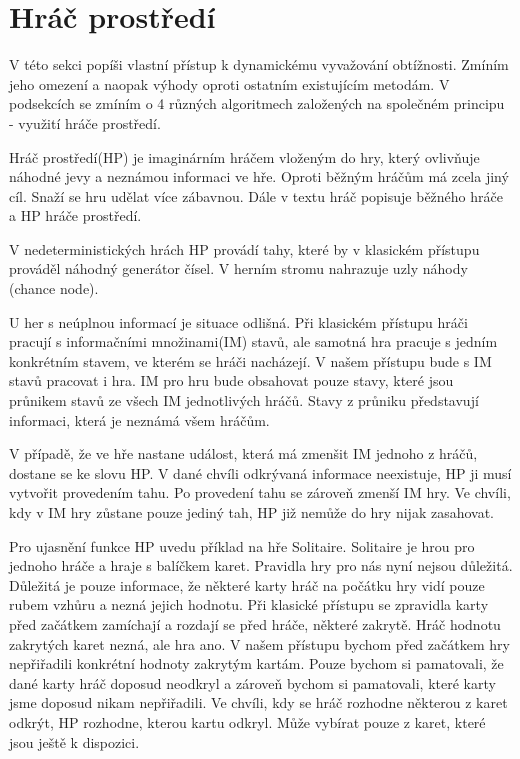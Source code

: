 \section{Hráč prostředí}

V této sekci popíši vlastní přístup k dynamickému vyvažování obtížnosti. Zmíním jeho omezení a naopak výhody oproti ostatním existujícím metodám. V podsekcích se zmíním o 4 různých algoritmech založených na společném principu - využití hráče prostředí.

Hráč prostředí(HP) je imaginárním hráčem vloženým do hry, který ovlivňuje náhodné jevy a neznámou informaci ve hře. Oproti běžným hráčům má zcela jiný cíl. Snaží se hru udělat více zábavnou. Dále v textu hráč popisuje běžného hráče a HP hráče prostředí.

V nedeterministických hrách HP provádí tahy, které by v klasickém přístupu prováděl náhodný generátor čísel. V herním stromu nahrazuje uzly náhody (chance node). 

U her s neúplnou informací je situace odlišná. Při klasickém přístupu hráči pracují s informačními množinami(IM) stavů, ale samotná hra pracuje s jedním konkrétním stavem, ve kterém se hráči nacházejí. V našem přístupu bude s IM stavů pracovat i hra. IM pro hru bude obsahovat pouze stavy, které jsou průnikem stavů ze všech IM jednotlivých hráčů. Stavy z průniku představují informaci, která je neznámá všem hráčům. 

V případě, že ve hře nastane událost, která má zmenšit IM jednoho z hráčů, dostane se ke slovu HP. V dané chvíli odkrývaná informace neexistuje, HP ji musí vytvořit provedením tahu. Po provedení tahu se zároveň zmenší IM hry. Ve chvíli, kdy v IM hry zůstane pouze jediný tah, HP již nemůže do hry nijak zasahovat.

Pro ujasnění funkce HP uvedu příklad na hře Solitaire. Solitaire je hrou pro jednoho hráče a hraje s balíčkem karet. Pravidla hry pro nás nyní nejsou důležitá. Důležitá je pouze informace, že některé karty hráč na počátku hry vidí pouze rubem vzhůru a nezná jejich hodnotu. Při klasické přístupu se zpravidla karty před začátkem zamíchají a rozdají se před hráče, některé zakrytě. Hráč hodnotu zakrytých karet nezná, ale hra ano. V našem přístupu bychom před začátkem hry nepřiřadili konkrétní hodnoty zakrytým kartám. Pouze bychom si pamatovali, že dané karty hráč doposud neodkryl a zároveň bychom si pamatovali, které karty jsme doposud nikam nepřiřadili. Ve chvíli, kdy se hráč rozhodne některou z karet odkrýt, HP rozhodne, kterou kartu odkryl. Může vybírat pouze z karet, které jsou ještě k dispozici.

